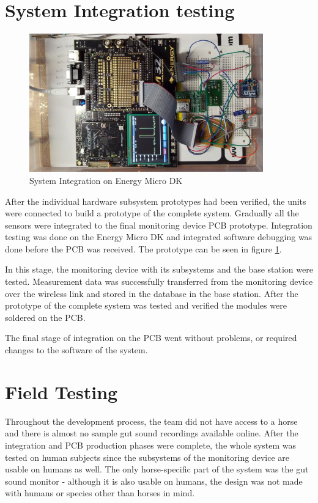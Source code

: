\section{System Integration testing}
\begin{figure}
\centering
\includegraphics[width=0.9\textwidth]{Images/integration_crop}
\caption{System Integration on Energy Micro DK}
\label{fig:integration}
\end{figure}
After the individual hardware subsystem prototypes had been verified, the units were connected to build a prototype of the complete system. Gradually all the sensors were integrated to the final monitoring device PCB prototype. Integration testing was done on the Energy Micro DK and integrated software debugging was done before the PCB was received. The prototype can be seen in figure \ref{fig:integration}.

In this stage, the monitoring device with its subsystems and the base station were tested. Measurement data was successfully transferred from the monitoring device over the wireless link and stored in the database in the base station. After the prototype of the complete system was tested and verified the modules were soldered on the PCB.

The final stage of integration on the PCB went without problems, or required changes to the software of the system.  



\section{Field Testing}
Throughout the development process, the team did not have access to a horse and there is almost no sample gut sound recordings available online. After the integration and PCB production phases were complete, the whole system \TODO{} was tested on human subjects since the subsystems of the monitoring device are usable on humans as well. The only horse-specific part of the system was the gut sound monitor - although it is also usable on humans, the design was not made with humans or species other than horses in mind. 

